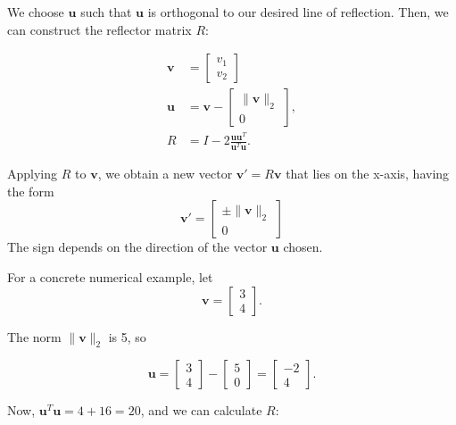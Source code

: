 We choose \( \mathbf{u} \) such that \( \mathbf{u} \) is orthogonal to our desired line of reflection. Then, we can construct the reflector matrix \( R \):

\begin{align*}
\mathbf{v} &= \begin{bmatrix} v_1 \\ v_2 \end{bmatrix} \\
\mathbf{u} &= \mathbf{v} - \begin{bmatrix} \| \mathbf{v} \|_2 \\ 0 \end{bmatrix}, \\
R &= I - 2\frac{\mathbf{u}\mathbf{u}^T}{\mathbf{u}^T\mathbf{u}}.
\end{align*}

Applying \( R \) to \( \mathbf{v} \), we obtain a new vector \( \mathbf{v}' = R\mathbf{v} \)
that lies on the x-axis, having the form
$$ \mathbf{v}' = \begin{bmatrix} \pm \| \mathbf{v} \|_2 \\ 0 \end{bmatrix} $$
The sign depends on the direction of the vector \( \mathbf{u} \) chosen.

For a concrete numerical example, let
\begin{equation*}
\mathbf{v} = \begin{bmatrix} 3 \\ 4 \end{bmatrix}.
\end{equation*}

The norm \( \| \mathbf{v} \|_2 \) is 5, so

\begin{equation*}
\mathbf{u} = \begin{bmatrix} 3 \\ 4 \end{bmatrix} - \begin{bmatrix} 5 \\ 0 \end{bmatrix} = \begin{bmatrix} -2 \\ 4 \end{bmatrix}.
\end{equation*}

Now, \( \mathbf{u}^T\mathbf{u} = 4 + 16 = 20 \), and we can calculate \( R \):


